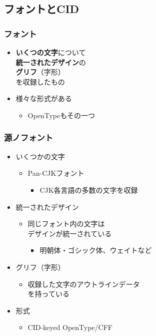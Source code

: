 \subsection{フォントとCID}
\begin{frame}\frametitle{フォント}
  \begin{itemize}
  \item \textbf{いくつの文字}について\\
    \textbf{統一されたデザイン}の\\
    \textbf{グリフ}（字形）\\
    を収録したもの
  \item 様々な形式がある
    \begin{itemize}
    \item OpenTypeもその一つ
    \end{itemize}
  \end{itemize}
\end{frame}

\begin{frame}\frametitle{源ノフォント}
  \begin{itemize}
  \item いくつかの文字
    \begin{itemize}
    \item Pan-CJKフォント
      \begin{itemize}
      \item CJK各言語の多数の文字を収録
      \end{itemize}
    \end{itemize}
  \item 統一されたデザイン
    \begin{itemize}
    \item 同じフォント内の文字は\\
      デザインが統一されている
      \begin{itemize}
        \item 明朝体・ゴシック体、ウェイトなど
      \end{itemize}
    \end{itemize}
  \item グリフ（字形）
    \begin{itemize}
    \item 収録した文字のアウトラインデータ\\
      を持っている
    \end{itemize}
  \item 形式
    \begin{itemize}
    \item CID-keyed OpenType/CFF
    \end{itemize}
  \end{itemize}
\end{frame}

